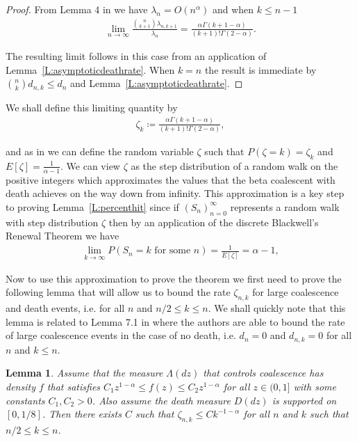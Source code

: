 \documentclass[11pt]{article}
\newtheorem{lemma}{Lemma}
\theoremstyle{definition}
\newcommand{\lemref}[1]{Lemma~\ref{L:#1}}
\begin{document}
\begin{proof}
    From Lemma 4 in \cite{stochasticflows3} we have $\lambda_n = O(n^\alpha)$ and when $k \leq n-1$
    \begin{align*}
        \lim_{n \to \infty}\frac{\binom{n}{k+1} \lambda_{n,k+1}}{\lambda_n} = \frac{\alpha\Gamma(k + 1 - \alpha)}{(k+1)!\Gamma(2-\alpha)}.
    \end{align*}

    \noindent The resulting limit follows in this case from an application of \lemref{asymptoticdeathrate}. When $k = n$ the result is immediate by $\binom{n}{k}d_{n,k} \leq d_n$ and \lemref{asymptoticdeathrate}.
\end{proof}

\noindent We shall define this limiting quantity by
%
\begin{align*}
    \zeta_k \coloneqq \frac{\alpha\Gamma(k + 1 - \alpha)}{(k+1)!\Gamma(2-\alpha)},
\end{align*}

\noindent and as in \cite{betasmalltime} we can define the random variable $\zeta$ such that $P(\zeta = k) = \zeta_k$ and $E[\zeta] = \frac{1}{\alpha - 1}$. We can view $\zeta$ as the step distribution of a random walk on the positive integers which approximates the values that the beta coalescent with death achieves on the way down from infinity. This approximation is a key step to proving \lemref{percenthit} since if $(S_n)_{n = 0}^\infty$ represents a random walk with step distribution $\zeta$ then by an application of the discrete Blackwell's Renewal Theorem we have
%
\begin{align*}
    \lim_{k \to \infty}P(S_n = k \text{ for some $n$}) = \frac{1}{E[\zeta]} =  \alpha -1,
\end{align*}

\noindent Now to use this approximation to prove the theorem we first need to prove the following lemma that will allow us to bound the rate $\zeta_{n,k}$ for large coalescence and death events, i.e. for all $n$ and $n/2 \leq k \leq n$. We shall quickly note that this lemma is related to Lemma 7.1 in \cite{betasmalltime} where the authors are able to bound the rate of large coalescence events in the case of no death, i.e. $d_n = 0$ and $d_{n,k} = 0$ for all $n$ and $k \leq n$.

\begin{lemma}\label{L:lambdaregularity}
    Assume that the measure $\Lambda(dz)$ that controls coalescence has density $f$ that satisfies $C_1z^{1-\alpha} \leq f(z) \leq C_2z^{1-\alpha}$ for all $z \in (0,1]$ with some constants $C_1, C_2 > 0$. Also assume the death measure $D(dz)$ is supported on $[0, 1/8]$. Then there exists $C$ such that $\zeta_{n,k} \leq Ck^{-1-\alpha}$ for all $n$ and $k$ such that $n/2 \leq k \leq n$.
\end{lemma}
\end{document}
